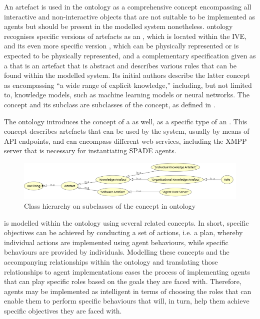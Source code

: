  An artefact is used in the  ontology as a comprehensive concept encompassing all interactive and non-interactive objects that are not suitable to be implemented as agents but should be present in the modelled system nonetheless.  ontology recognises specific versions of artefacts as an , which is located within the \ac{IVE}, and its even more specific version , which can be physically represented or is expected to be physically represented, and a complementary specification given as a  that is an artefact that is abstract and describes various rules that can be found within the modelled system. Its initial authors describe the latter concept as encompassing \enquote{a wide range of explicit knowledge,} including, but not limited to, knowledge models, such as machine learning models or neural networks. The  concept and its subclass  are subclasses of the  concept,
%
as defined in .

The \magoontologyname ontology introduces the concept of a  as well, as a specific type of an . This concept describes artefacts that can be used by the system, usually by means of API endpoints, and can encompass different web services, including the XMPP server that is necessary for instantiating SPADE agents.

\begin{figure}
    \centering
    \includegraphics[width=1\linewidth]{Deliverables/Phase 1/Figures/software artefact.png}
    \caption{Class hierarchy on subclasses of the  concept in \magoontologyname ontology}
    \label{fig: Hierarchy artefact KNartefact norm role}
\end{figure}

 is modelled within the \magoontologyname ontology using several related concepts. In short, specific objectives can be achieved by conducting a set of actions, i.e. a plan, whereby individual actions are implemented using agent behaviours, while specific behaviours are provided by  individuals. Modelling these concepts and the accompanying relationships within the ontology and translating those relationships to agent implementations eases the process of implementing agents that can play specific roles based on the goals they are faced with. Therefore, agents may be implemented as intelligent in terms of choosing the roles that can enable them to perform specific behaviours that will, in turn, help them achieve specific objectives they are faced with.

